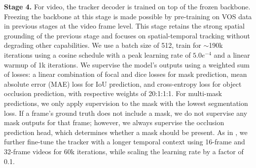 \documentclass[]{fairmeta}
\renewcommand{\paragraph}[1]{%
	\noindent\textbf{#1.}\noindent\xspace%
}
\begin{document}
\paragraph{Stage 4} For video, the tracker decoder is trained on top of the frozen backbone. Freezing the backbone at this stage is made possible by pre-training on VOS data in previous stages at the video frame level. This stage retains the strong spatial grounding of the previous stage and focuses on spatial-temporal tracking without degrading other capabilities. We use a batch size of 512, train for $\sim$190k iterations using a cosine schedule with a peak learning rate of $5.0e^{-4}$ and a linear warmup of 1k iterations. We supervise the model’s outputs using a weighted sum of losses: a linear combination of focal and dice losses for mask prediction, mean absolute error (MAE) loss for IoU prediction, and cross-entropy loss for object occlusion prediction, with respective weights of 20:1:1:1. For multi-mask predictions, we only apply supervision to the mask with the lowest segmentation loss. If a frame’s ground truth does not include a mask, we do not supervise any mask outputs for that frame; however, we always supervise the occlusion prediction head, which determines whether a mask should be present. As in \cite{sam2}, we further fine-tune the tracker with a longer temporal context using 16-frame and 32-frame videos for 60k iterations, while scaling the learning rate by a factor of 0.1.
\end{document}
